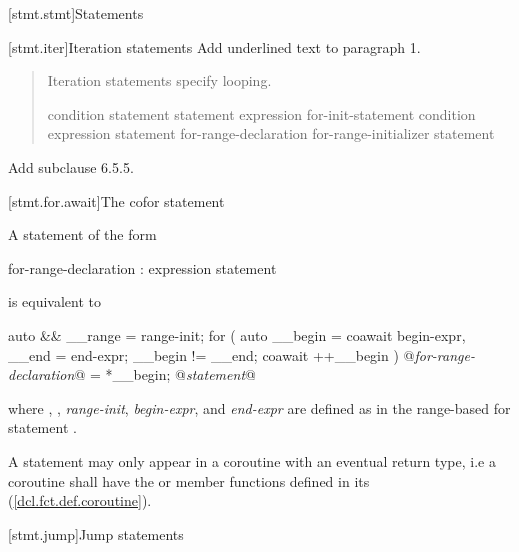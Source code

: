 
[stmt.stmt]{Statements}%

\setcounter{section}{4}
[stmt.iter]{Iteration statements}%
Add underlined text to paragraph 1.

\begin{quote}
\pnum
Iteration statements specify looping.

%
%
%
%
\begin{bnf}
	\br
	 condition \terminal{)} statement\br
	 statement  expression \terminal{) ;}\br
	 for-init-statement condition\opt \terminal{;} expression\opt \terminal{)} statement\br
	 for-range-declaration \terminal{:} for-range-initializer \terminal{)} statement\br
\end{bnf}
\end{quote}

Add subclause 6.5.5.

\setcounter{subsection}{4}
[stmt.for.await]{The cofor statement}%

\pnum
A  statement of the form

\begin{ncbnf}
	 for-range-declaration : expression \terminal{)} statement
\end{ncbnf}

is equivalent to

\begin{codeblock}
	{
		auto && __range = range-init;
		for ( auto __begin = coawait begin-expr,
		__end = end-expr;
		__begin != __end;
		coawait ++__begin ) {
			@\textit{for-range-declaration}@ = *__begin;
			@\textit{statement}@
		}
	}
\end{codeblock}

where , , 
\textit{range-init}, \textit{begin-expr}, and \textit{end-expr} are defined as in the range-based for statement .

\pnum
A  statement may only appear in a coroutine 
with an eventual return type, i.e a coroutine shall have the  or  member
functions defined in its  (\ref{dcl.fct.def.coroutine}).

\setcounter{section}{5}
[stmt.jump]{Jump statements}%

